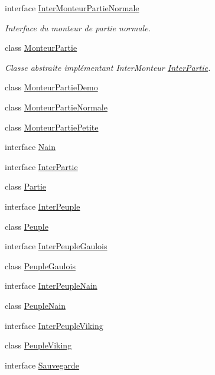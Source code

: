 \begin{DoxyCompactItemize}
interface \hyperlink{interface_small_world_1_1_inter_monteur_partie_normale}{Inter\-Monteur\-Partie\-Normale}
\begin{DoxyCompactList}\small\item\em Interface du monteur de partie normale. \end{DoxyCompactList}\item 
class \hyperlink{class_small_world_1_1_monteur_partie}{Monteur\-Partie}
\begin{DoxyCompactList}\small\item\em Classe abstraite implémentant Inter\-Monteur \hyperlink{interface_small_world_1_1_inter_partie}{Inter\-Partie}. \end{DoxyCompactList}\item 
class \hyperlink{class_small_world_1_1_monteur_partie_demo}{Monteur\-Partie\-Demo}
\item 
class \hyperlink{class_small_world_1_1_monteur_partie_normale}{Monteur\-Partie\-Normale}
\item 
class \hyperlink{class_small_world_1_1_monteur_partie_petite}{Monteur\-Partie\-Petite}
\item 
interface \hyperlink{interface_small_world_1_1_nain}{Nain}
\item 
interface \hyperlink{interface_small_world_1_1_inter_partie}{Inter\-Partie}
\item 
class \hyperlink{class_small_world_1_1_partie}{Partie}
\item 
interface \hyperlink{interface_small_world_1_1_inter_peuple}{Inter\-Peuple}
\item 
class \hyperlink{class_small_world_1_1_peuple}{Peuple}
\item 
interface \hyperlink{interface_small_world_1_1_inter_peuple_gaulois}{Inter\-Peuple\-Gaulois}
\item 
class \hyperlink{class_small_world_1_1_peuple_gaulois}{Peuple\-Gaulois}
\item 
interface \hyperlink{interface_small_world_1_1_inter_peuple_nain}{Inter\-Peuple\-Nain}
\item 
class \hyperlink{class_small_world_1_1_peuple_nain}{Peuple\-Nain}
\item 
interface \hyperlink{interface_small_world_1_1_inter_peuple_viking}{Inter\-Peuple\-Viking}
\item 
class \hyperlink{class_small_world_1_1_peuple_viking}{Peuple\-Viking}
\item 
interface \hyperlink{interface_small_world_1_1_sauvegarde}{Sauvegarde}
\item 

\end{DoxyCompactItemize}
